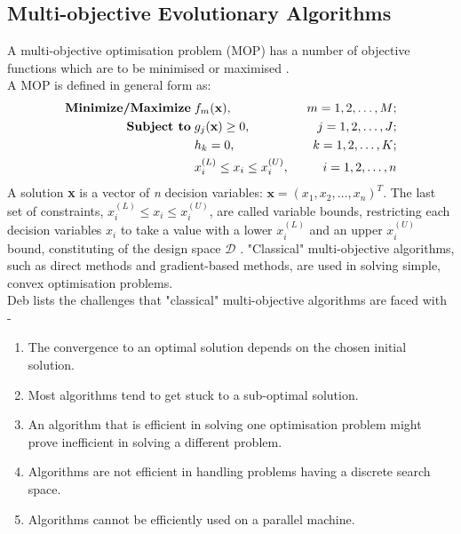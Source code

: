 \documentclass[sigconf,nonacm]{acmart}
\begin{document}
\subsection{Multi-objective Evolutionary Algorithms}
A multi-objective optimisation problem (MOP) has a number of objective functions which are to be minimised or maximised \cite{deb2001}.\\ A MOP is defined in general form as:
\begin{align*}
	\textbf{Minimize/Maximize} \hspace{0.1cm}
    & f_m(\textbf{x}), \hspace{0.2cm}
    & m = 1, 2, \ldots, M; \\
    \textbf{Subject to} \hspace{0.1cm}
    & g_{j}(\textbf{x}) \ge 0, \hspace{0.2cm}
    & j = 1, 2, \ldots, J; \\
    & h_{k} = 0, \hspace{0.2cm}
    & k = 1, 2, \ldots, K; \\
    & x_{i}^{(L)} \le x_{i} \le x_{i}^{(U)}, \hspace{0.2cm}
    & i = 1, 2, \ldots, n
\end{align*}
A solution \textbf{x} is a vector of \textit{n} decision variables: $\textbf{x} = (x_{1}, x_{2}, \ldots, x_{n})^{T}$. The last set of constraints, $x_{i}^{(L)} \le x_{i} \le x_{i}^{(U)}$, are called variable bounds, restricting each decision variables $x_{i}$ to take a value with a lower $x_{i}^{(L)}$ and an upper $x_{i}^{(U)}$ bound, constituting of the design space $\mathcal{D}$ \cite{deb2002}. "Classical" multi-objective algorithms, such as direct methods and gradient-based methods, are used in solving simple, convex optimisation problems.\\
Deb \cite{deb2002} lists the challenges that "classical" multi-objective algorithms are faced with -
\begin{enumerate}
\item The convergence to an optimal solution depends on the chosen initial solution.
\item Most algorithms tend to get stuck to a sub-optimal solution.
\item An algorithm that is efficient in solving one optimisation problem might prove inefficient in solving a different problem.
\item Algorithms are not efficient in handling problems having a discrete search space.
\item Algorithms cannot be efficiently used on a parallel machine.
\end{enumerate}
\end{document}
